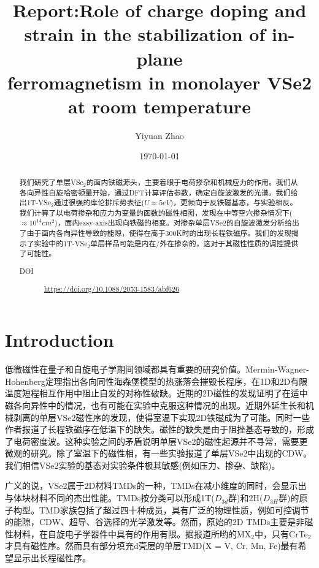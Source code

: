 \documentclass[reprint, aps, prb, showkeys]{revtex4-2}
\begin{document}
\title{Report:Role of charge doping and strain in the stabilization of in-plane \\
ferromagnetism in monolayer VSe2 at room temperature}

\author{Yiyuan Zhao}
\date{\today}

\begin{abstract}
我们研究了单层VSe$_2$的面内铁磁源头，主要着眼于电荷掺杂和机械应力的作用。我们从各向异性自旋哈密顿量开始，通过DFT计算评估参数，确定自旋波激发的光谱。我们给出1T-VSe$_2$通过很强的库伦排斥势表征($U \approx 5 eV$)，更倾向于反铁磁基态，与实验相反。我们计算了以电荷掺杂和应力为变量的函数的磁性相图，发现在中等空穴掺杂情况下($\approx 10^{14} cm^2$)，面内easy-axis出现向铁磁的相变。对掺杂单层VSe2的自旋波激发分析给出了由于面内各向异性导致的能隙，使得在高于300K时的出现长程铁磁序。我们的发现揭示了实验中的1T-VSe$_2$单层样品可能是内在/外在掺杂的，这对于其磁性性质的调控提供了可能性。

\begin{description}
    \item[DOI] \url{https://doi.org/10.1088/2053-1583/abf626}
\end{description}
\end{abstract}


\maketitle

\section{Introduction}
低微磁性在量子和自旋电子学期间领域都具有重要的研究价值。Mermin-Wagner-Hohenberg定理指出各向同性海森堡模型的热涨落会摧毁长程序，在1D和2D有限温度短程相互作用中阻止自发的对称性破缺。近期的2D磁性的发现证明了在适中磁各向异性中的情况，也有可能在实验中克服这种情况的出现。近期外延生长和机械剥离的单层VSe2磁性序的发现，使得室温下实现2D铁磁成为了可能。同时一些作者报道了长程铁磁序在低温下的缺失。磁性的缺失是由于阻挫基态导致的，形成了电荷密度波。这种实验之间的矛盾说明单层VSe2的磁性起源并不寻常，需要更微观的研究。除了室温下的磁性相，有一些实验报道了单层VSe2中出现的CDW。我们相信VSe2实验的基态对实验条件极其敏感(例如压力、掺杂、缺陷)。

广义的说，VSe2属于2D材料TMDs的一种，TMDs在减小维度的同时，会显示出与体块材料不同的杰出性能。TMDs按分类可以形成1T($D_{3d}$群)和2H($D_{3H}$群)的原子构型。TMD家族包括了超过四十种成员，具有广泛的物理性质，例如可控调节的能隙，CDW、超导、谷选择的光学激发等。然而，原始的2D TMDs主要是非磁性材料，在自旋电子学器件中具有的作用有限。据报道所哟的MX$_2$中，只有CrTe$_2$才具有磁性序。然而具有部分填充d壳层的单层TMD(X = V, Cr, Mn, Fe)最有希望显示出长程磁性序。
\end{document}
